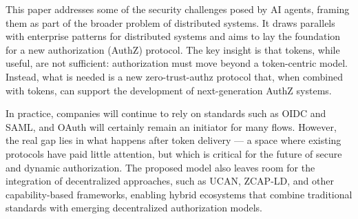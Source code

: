 This paper addresses some of the security challenges posed by AI agents, framing them as part of the broader problem of distributed systems. 
It draws parallels with enterprise patterns for distributed systems and aims to lay the foundation for a new authorization (AuthZ) protocol. 
The key insight is that tokens, while useful, are not sufficient: authorization must move beyond a token-centric model. 
Instead, what is needed is a new zero-trust-authz protocol that, when combined with tokens, can support the development of next-generation AuthZ systems.  

In practice, companies will continue to rely on standards such as OIDC and SAML, and OAuth will certainly remain an initiator for many flows. 
However, the real gap lies in what happens after token delivery — a space where existing protocols have paid little attention, but which is critical for the future of secure and dynamic authorization.  
The proposed model also leaves room for the integration of decentralized approaches, such as UCAN, ZCAP-LD, and other capability-based frameworks, enabling hybrid ecosystems that combine traditional standards with emerging decentralized authorization models.